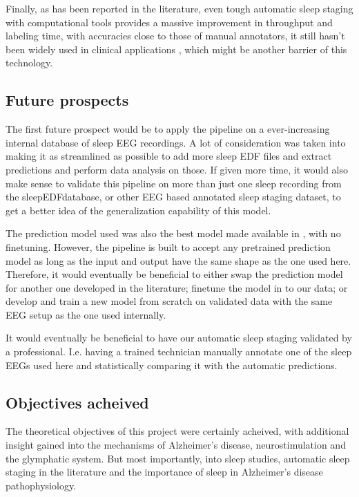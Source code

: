 Finally, as has been reported in the literature, even tough automatic sleep staging with computational tools provides a massive improvement in throughput and labeling time, with accuracies close to those of manual annotators, it still hasn't been widely used in clinical applications \cite{2022automaticEEG}, which might be another barrier of this technology.  


\subsection{Future prospects}
The first future prospect would be to apply the pipeline on a ever-increasing internal database of sleep EEG recordings. A lot of consideration was taken into making it as streamlined as possible to add more sleep EDF files and extract predictions and perform data analysis on those.
If given more time, it would also make sense to validate this pipeline on more than just one sleep recording from the sleepEDFdatabase, or other EEG based annotated sleep staging dataset, to get a better idea of the generalization capability of this model.

The prediction model used was also the best model made available in \cite{Alexander2020}, with no finetuning. However, the pipeline is built to accept any pretrained prediction model as long as the input and output have the same shape as the one used here. Therefore, it would eventually be beneficial to either swap the prediction model for another one developed in the literature; finetune the model in \cite{Alexander2020} to our data; or develop and train a new model from scratch on validated data with the same EEG setup as the one used internally.


It would eventually be beneficial to have our automatic sleep staging validated by a professional. I.e. having a trained technician manually annotate one of the sleep EEGs used here and statistically comparing it with the automatic predictions. 



\subsection{Objectives acheived}
The theoretical objectives of this project were certainly acheived, with additional insight gained into the mechanisms of Alzheimer's disease, neurostimulation and the glymphatic system. But most importantly, into sleep studies, automatic sleep staging in the literature and the importance of sleep in Alzheimer's disease pathophysiology.

